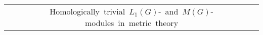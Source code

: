 \bigskip

\begin{scriptsize}
\begin{longtable}{|c|c|c|c|c|c|c|} 
\multicolumn{7}{c}{\mbox{Homologically trivial $L_1(G)$- and $M(G)$-modules in metric theory}}                                                                                                                                                                                                                                                                                                                                                                                                                                                                                                                                                                                                                                                                                                                                                                                                                                                                                                                                             \\
				 

\end{longtable}
\end{scriptsize}
